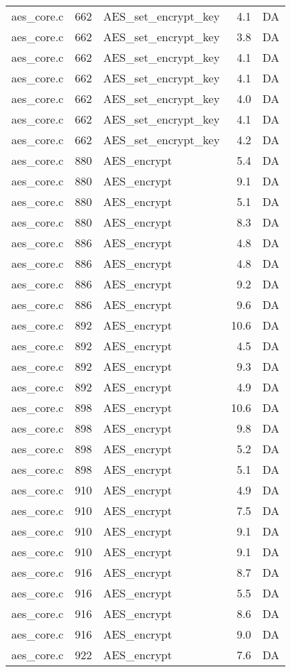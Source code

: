 \begin{table}[!ht]
\begin{tabular}{lrlrr}
aes\_core.c& 662&AES\_set\_encrypt\_key&4.1 &DA\\
aes\_core.c& 662&AES\_set\_encrypt\_key&3.8 &DA\\
aes\_core.c& 662&AES\_set\_encrypt\_key&4.1 &DA\\
aes\_core.c& 662&AES\_set\_encrypt\_key&4.1 &DA\\
aes\_core.c& 662&AES\_set\_encrypt\_key&4.0 &DA\\
aes\_core.c& 662&AES\_set\_encrypt\_key&4.1 &DA\\
aes\_core.c& 662&AES\_set\_encrypt\_key&4.2 &DA\\
aes\_core.c& 880&AES\_encrypt&5.4 &DA\\
aes\_core.c& 880&AES\_encrypt&9.1 &DA\\
aes\_core.c& 880&AES\_encrypt&5.1 &DA\\
aes\_core.c& 880&AES\_encrypt&8.3 &DA\\
aes\_core.c& 886&AES\_encrypt&4.8 &DA\\
aes\_core.c& 886&AES\_encrypt&4.8 &DA\\
aes\_core.c& 886&AES\_encrypt&9.2 &DA\\
aes\_core.c& 886&AES\_encrypt&9.6 &DA\\
aes\_core.c& 892&AES\_encrypt&10.6 &DA\\
aes\_core.c& 892&AES\_encrypt&4.5 &DA\\
aes\_core.c& 892&AES\_encrypt&9.3 &DA\\
aes\_core.c& 892&AES\_encrypt&4.9 &DA\\
aes\_core.c& 898&AES\_encrypt&10.6 &DA\\
aes\_core.c& 898&AES\_encrypt&9.8 &DA\\
aes\_core.c& 898&AES\_encrypt&5.2 &DA\\
aes\_core.c& 898&AES\_encrypt&5.1 &DA\\
aes\_core.c& 910&AES\_encrypt&4.9 &DA\\
aes\_core.c& 910&AES\_encrypt&7.5 &DA\\
aes\_core.c& 910&AES\_encrypt&9.1 &DA\\
aes\_core.c& 910&AES\_encrypt&9.1 &DA\\
aes\_core.c& 916&AES\_encrypt&8.7 &DA\\
aes\_core.c& 916&AES\_encrypt&5.5 &DA\\
aes\_core.c& 916&AES\_encrypt&8.6 &DA\\
aes\_core.c& 916&AES\_encrypt&9.0 &DA\\
aes\_core.c& 922&AES\_encrypt&7.6 &DA\\

\end{tabular}
\end{table}
